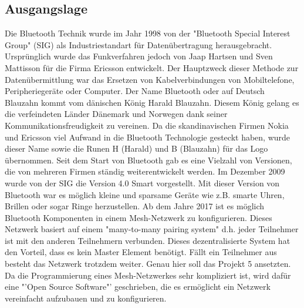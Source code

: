 
\subsection{Ausgangslage}\label{subsec:Ausgangslage}

Die Bluetooth Technik wurde im Jahr 1998 von der "Bluetooth Special Interest Group" (SIG) als Industriestandart für Datenübertragung herausgebracht. Ursprünglich wurde das Funkverfahren jedoch von Jaap Hartsen und Sven Mattisson für die Firma Ericsson entwickelt. Der Hauptzweck dieser Methode zur Datenübermittlung war das Ersetzen von Kabelverbindungen von Mobiltelefone, Peripheriegeräte oder Computer. Der Name Bluetooth oder auf Deutsch Blauzahn kommt vom dänischen König Harald Blauzahn. Diesem König gelang es die verfeindeten Länder Dänemark und Norwegen dank seiner Kommunikationsfreudigkeit zu vereinen. Da die skandinavischen Firmen Nokia und Ericsson viel Aufwand in die Bluetooth Technologie gesteckt haben, wurde dieser Name sowie die Runen H (Harald) und B (Blauzahn) für das Logo übernommen.\cite{michna_entwicklungsgeschichte_2019} Seit dem Start von Bluetooth gab es eine Vielzahl von Versionen, die von mehreren Firmen ständig weiterentwickelt werden. Im Dezember 2009 wurde von der SIG die Version 4.0 Smart vorgestellt. Mit dieser Version von Bluetooth war es möglich kleine und sparsame Geräte wie z.B. smarte Uhren, Brillen oder sogar Ringe herzustellen.\cite{bluetooth_sig_our_2019} Ab dem Jahre 2017 ist es möglich Bluetooth Komponenten in einem Mesh-Netzwerk zu konfigurieren.\cite{eckstein_neue_2019} Dieses Netzwerk basiert auf einem "many-to-many pairing system" d.h. jeder Teilnehmer ist mit den anderen Teilnehmern verbunden. Dieses dezentralisierte System hat den Vorteil, dass es kein Master Element benötigt. Fällt ein Teilnehmer aus besteht das Netzwerk trotzdem weiter.\cite{woolley_intro_2017} Genau hier soll das Projekt 5 ansetzten. Da die Programmierung eines Mesh-Netzwerkes sehr kompliziert ist, wird dafür eine "'Open Source Software"' geschrieben, die es ermöglicht ein Netzwerk vereinfacht aufzubauen und zu konfigurieren.








